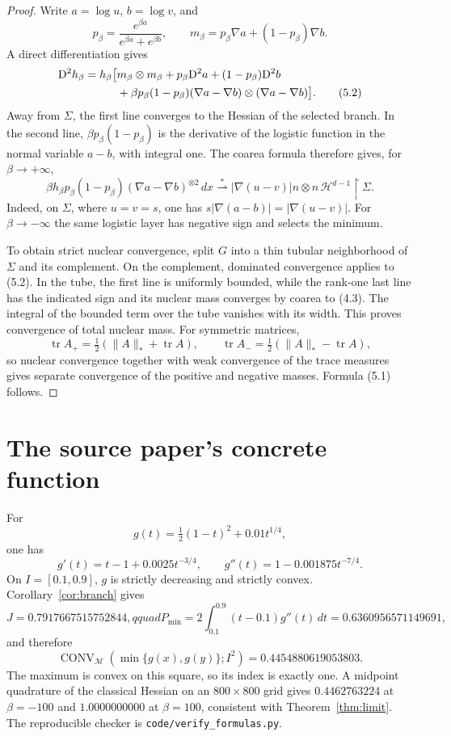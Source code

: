 \documentclass[11pt]{article}
\newcommand{\tr}{\operatorname{tr}}
\newcommand{\M}{\mathcal M}
\newcommand{\Hess}{\mathrm D^2}
\newcommand{\Conv}{\operatorname{CONV}}
\begin{document}
\begin{proof}
Write \(a=\log u\), \(b=\log v\), and
\[
 p_\beta=\frac{e^{\beta a}}{e^{\beta a}+e^{\beta b}},\qquad
 m_\beta=p_\beta\nabla a+(1-p_\beta)\nabla b.
\]
A direct differentiation gives
\begin{align}
 \Hess h_\beta
 =h_\beta\bigl[&m_\beta\otimes m_\beta
 +p_\beta\Hess a+(1-p_\beta)\Hess b\notag\\
 &+\beta p_\beta(1-p_\beta)
 (\nabla a-\nabla b)\otimes(\nabla a-\nabla b)\bigr].    \tag{5.2}
\end{align}
Away from \(\Sigma\), the first line converges to the Hessian of the selected
branch.  In the second line,
\(\beta p_\beta(1-p_\beta)\) is the derivative of the logistic function in
the normal variable \(a-b\), with integral one.  The coarea formula therefore
gives, for \(\beta\to+\infty\),
\[
 \beta h_\beta p_\beta(1-p_\beta)
 (\nabla a-\nabla b)^{\otimes2}\,dx
 \stackrel{*}{\rightharpoonup}
 |\nabla(u-v)|n\otimes n\,
 \mathcal H^{d-1}\!\restriction\Sigma.
\]
Indeed, on \(\Sigma\), where \(u=v=s\), one has
\(s|\nabla(a-b)|=|\nabla(u-v)|\).  For \(\beta\to-\infty\) the same logistic
layer has negative sign and selects the minimum.

To obtain strict nuclear convergence, split \(G\) into a thin tubular
neighborhood of \(\Sigma\) and its complement.  On the complement, dominated
convergence applies to (5.2).  In the tube, the first line is uniformly
bounded, while the rank-one last line has the indicated sign and its nuclear
mass converges by coarea to (4.3).  The integral of the bounded term over the
tube vanishes with its width.  This proves convergence of total nuclear mass.
For symmetric matrices,
\[
 \tr A_+=\tfrac12(\|A\|_*+\tr A),\qquad
 \tr A_-=\tfrac12(\|A\|_*-\tr A),
\]
so nuclear convergence together with weak convergence of the trace measures
gives separate convergence of the positive and negative masses.  Formula
(5.1) follows.
\end{proof}

\section{The source paper's concrete function}

For
\[
 g(t)=\tfrac12(1-t)^2+0.01t^{1/4},
\]
one has
\[
 g'(t)=t-1+0.0025t^{-3/4},\qquad
 g''(t)=1-0.001875t^{-7/4}.
\]
On \(I=[0.1,0.9]\), \(g\) is strictly decreasing and strictly convex.
Corollary~\ref{cor:branch} gives
\[
 J=0.7917667515752844,qquad
 P_{\min}=2\int_{0.1}^{0.9}(t-0.1)g''(t)\,dt
 =0.6360956571149691,
\]
and therefore
\[
 \boxed{\Conv_{\M}(\min\{g(x),g(y)\};I^2)
 =0.4454880619053803.}
\]
The maximum is convex on this square, so its index is exactly one.  A midpoint
quadrature of the classical Hessian on an \(800\times800\) grid gives
\(0.4462763224\) at \(\beta=-100\) and \(1.0000000000\) at \(\beta=100\),
consistent with Theorem~\ref{thm:limit}.  The reproducible checker is
\texttt{code/verify\_formulas.py}.
\end{document}
